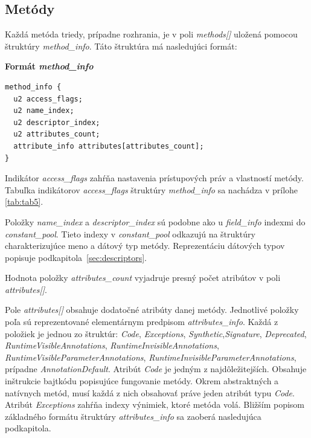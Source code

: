 \documentclass[11pt,final,oneside]{fithesis}
\newenvironment{example}[1]
{
\vspace{3mm}
\noindent\textbf{#1}
\vspace{2mm}
}
{
\vspace{3mm}
}
\begin{document}
\subsection{Metódy}
\label{sec:methods}
Každá metóda triedy, prípadne rozhrania, je v poli \textit{methods[]} uložená
pomocou štruktúry \textit{method\_info}. Táto štruktúra má
nasledujúci formát:

\begin{example}{Formát \textit{method\_info}}
\begin{verbatim}
method_info {
  u2 access_flags;
  u2 name_index;
  u2 descriptor_index;
  u2 attributes_count;
  attribute_info attributes[attributes_count];
}
\end{verbatim}
\end{example}

Indikátor \textit{access\_flags} zahŕňa nastavenia prístupových práv a
vlastností metódy. Tabuľka indikátorov \textit{access\_flags} štruktúry
\textit{method\_info} sa nachádza v prílohe \ref{tab:tab5}.

Položky \textit{name\_index} a \textit{descriptor\_index} sú podobne ako u
\textit{field\_info} indexmi do \textit{constant\_pool}. Tieto indexy
v \textit{constant\_pool} odkazujú na štruktúry charakterizujúce meno a dátový typ metódy. Reprezentáciu dátových typov popisuje
podkapitola~\ref{sec:descriptors}.

Hodnota položky \textit{attributes\_count} vyjadruje presný počet atribútov
v poli \textit{attributes[]}.

Pole \textit{attributes[]} obsahuje dodatočné atribúty danej metódy.
Jednotlivé položky poľa sú reprezentované elementárnym predpisom
\textit{attributes\_info}. Každá
z položiek je jednou zo štruktúr: \textit{Code}, \textit{Exceptions},
\textit{Synthetic},\textit{Signature}, \textit{Deprecated},
\textit{RuntimeVisibleAnnotations}, \textit{RuntimeInvisibleAnnotations},
\textit{RuntimeVisibleParameterAnnotations},
\textit{RuntimeInvisibleParameterAnnotations},
prípadne \textit{AnnotationDefault}.
Atribút \textit{Code} je jedným z najdôležitejších. Obsahuje inštrukcie
bajtkódu popisujúce fungovanie metódy. Okrem abstraktných a natívnych metód, musí každá z nich obsahovať práve jeden atribút typu
\textit{Code}. Atribút \textit{Exceptions} zahŕňa indexy výnimiek, ktoré
metóda volá. Bližším popisom základného formátu štruktúry \textit{attributes\_info} sa
zaoberá nasledujúca podkapitola.
\end{document}
